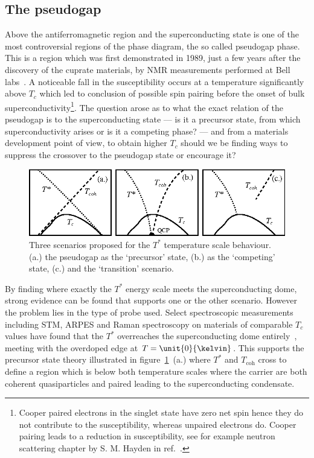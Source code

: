 \subsection{The pseudogap}
    \label{Sec:Intro:Pseudogap}

Above the antiferromagnetic region and the superconducting state is one of the most controversial regions of the phase diagram, the so called pseudogap phase. This is a region which was first demonstrated in 1989, just a few years after the discovery of the cuprate materials, by \ac{NMR} measurements performed at Bell labs~\cite{Warren1989}. A noticeable fall in the susceptibility occurs at a temperature significantly above $T_c$ which led to conclusion of possible spin pairing before the onset of bulk superconductivity\footnote{Cooper paired electrons in the singlet state have zero net spin hence they do not contribute to the susceptibility, whereas unpaired electrons do. Cooper pairing leads to a reduction in susceptibility, see for example neutron scattering chapter by S. M. Hayden in ref.~\cite{Hayden}.}. The question arose as to what the exact relation of the pseudogap is to the superconducting state --- is it a precursor state, from which superconductivity arises or is it a competing phase? --- and from a materials development point of view, to obtain higher $T_c$ should we be finding ways to suppress the crossover to the pseudogap state or encourage it?
\begin{figure}[htbp]
    \begin{center}
        \includegraphics[scale=1.3]{Chapter-Introduction/Figures/PGScenarios/PGScenarios}
        \caption{Three scenarios proposed for the $T^*$ temperature scale behaviour. (a.) the pseudogap as the `precursor' state, (b.) as the `competing' state, (c.) and the `transition' scenario.}
        \label{Fig:Intro:PGScenario}
    \end{center}
\end{figure}
By finding where exactly the $T^*$ energy scale meets the superconducting dome, strong evidence can be found that supports one or the other scenario. However the problem lies in the type of probe used. Select spectroscopic measurements including \ac{STM}, \ac{ARPES} and Raman spectroscopy on materials of comparable $T_c$ values have found that the $T^*$ overreaches the superconducting dome entirely~\cite{Hufner2008}, meeting with the overdoped edge at $T=\unit{0}{\kelvin}$. This supports the precursor state theory illustrated in figure~\ref{Fig:Intro:PGScenario}~(a.) where $T^*$ and $T_{\textrm{coh}}$ cross to define a region which is below both temperature scales where the carrier are both coherent quasiparticles and paired leading to the superconducting condensate.

